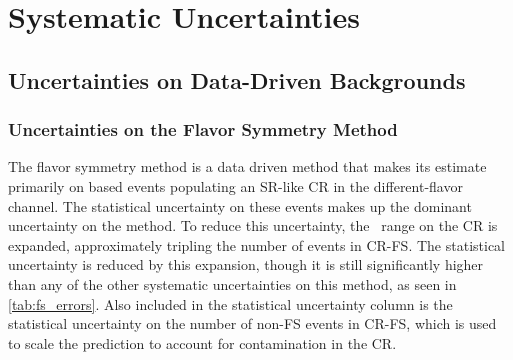 
\chapter{Systematic Uncertainties} %

\label{ch:background_uncertainties} 

\section{Uncertainties on Data-Driven Backgrounds}

\subsection{Uncertainties on the Flavor Symmetry Method}
\label{sec:unc_fs}

The flavor symmetry method is a data driven method that makes its estimate primarily on based events populating an \ac{SR}-like \ac{CR} in the different-flavor channel. The statistical uncertainty on these events makes up the dominant uncertainty on the method. To reduce this uncertainty, the \mll~range on the \ac{CR} is expanded, approximately tripling the number of events in CR-FS. The statistical uncertainty is reduced by this expansion, though it is still significantly higher than any of the other systematic uncertainties on this method, as seen in \autoref{tab:fs_errors}. Also included in the statistical uncertainty column is the statistical uncertainty on the number of non-\ac{FS} events in CR-FS, which is used to scale the prediction to account for contamination in the \ac{CR}. 

